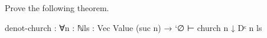 \begin{fence}
\begin{code}%
\>[0]\AgdaSpace{}%
\AgdaSymbol{:}\AgdaSpace{}%
\AgdaSymbol{(}\AgdaSpace{}%
\AgdaSymbol{:}\AgdaSpace{}%
\AgdaSymbol{)}\AgdaSpace{}%
\AgdaSpace{}%
\AgdaSpace{}%
\AgdaOperator{\AgdaInductiveConstructor{,}}\AgdaSpace{}%
\AgdaSpace{}%
\AgdaOperator{\AgdaInductiveConstructor{,}}\AgdaSpace{}%
\AgdaSpace{}%
\AgdaSpace{}%
\<%
\\
\>[0]\AgdaSpace{}%
\AgdaSpace{}%
\AgdaSymbol{=}\AgdaSpace{}%
\AgdaOperator{\AgdaFunction{\#}}\AgdaSpace{}%
\<%
\\
\>[0]\AgdaSpace{}%
\AgdaSymbol{(}\AgdaSpace{}%
\AgdaSymbol{)}\AgdaSpace{}%
\AgdaSymbol{=}\AgdaSpace{}%
\AgdaOperator{\AgdaFunction{\#}}\AgdaSpace{}%
\AgdaSpace{}%
\AgdaSpace{}%
\AgdaSpace{}%
\<%
\\
%
\\[\AgdaEmptyExtraSkip]%
\>[0]\AgdaSpace{}%
\AgdaSymbol{:}\AgdaSpace{}%
\AgdaSymbol{(}\AgdaSpace{}%
\AgdaSymbol{:}\AgdaSpace{}%
\AgdaSymbol{)}\AgdaSpace{}%
\AgdaSpace{}%
\AgdaSpace{}%
\AgdaSpace{}%
\<%
\\
\>[0]\AgdaSpace{}%
\AgdaSpace{}%
\AgdaSymbol{=}\AgdaSpace{}%
\AgdaSpace{}%
\AgdaSpace{}%
\AgdaSpace{}%
\<%
\end{code}
\end{fence}

Prove the following theorem.

\begin{myDisplay}
denot-church : ∀{n : ℕ}{ls : Vec Value (suc n)}
   → `∅ ⊢ church n ↓ Dᶜ n ls
\end{myDisplay}

\begin{fence}
\begin{code}%
\>[0]\<%
\end{code}
\end{fence}

